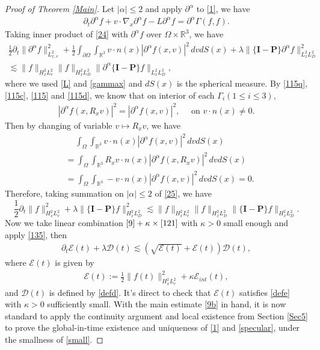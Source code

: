 \documentclass[reqno,a4paper]{amsart}
\numberwithin{equation}{section}
\newcommand{\1}{\mathbf{1}}
\newcommand{\R}{\mathbb{R}}
\renewcommand{\P}{\mathbf{P}}
\newcommand{\E}{\mathcal{E}}
\newcommand{\D}{\mathcal{D}}
\newcommand{\<}{\langle}
\renewcommand{\>}{\rangle}
\newcommand{\I}{\mathbf{I}}
\renewcommand{\P}{\mathbf{P}}
\begin{document}
\begin{proof}[Proof of Theorem \ref{Main}]
	Let $|\alpha|\le 2$ and apply $\partial^\alpha$ to \eqref{1}, we have 
	\begin{align}\label{24}
	\partial_t{\partial^\alpha f}+v\cdot\nabla_x{\partial^\alpha f} - L {\partial^\alpha f} = \partial^\alpha\Gamma(f,f).
	\end{align}
	Taking inner product of \eqref{24} with $\partial^\alpha f$ over $\Omega\times\R^3$, we have 
	\begin{multline}\label{25}
		\frac{1}{2}\partial_t\|\partial^\alpha f\|^2_{L^2_{x,v}} + \frac{1}{2}\int_{\partial\Omega}\int_{\R^3}v\cdot n(x)|\partial^\alpha f(x,v)|^2\,dvdS(x) + \lambda\|\{\I-\P\}\partial^\alpha f\|_{L^2_{x}L^2_D}^2\\ \lesssim \|f\|_{H^2_xL^2_v}\|f\|_{H^2_xL^2_D}\|\partial^\alpha\{\I-\P\} f\|_{L^2_xL^2_D},
	\end{multline}where we used \eqref{L} and \eqref{gammax} and $dS(x)$ is the spherical measure.
By \eqref{115q}, \eqref{115c}, \eqref{115} and \eqref{115d}, we know that on interior of each $\Gamma_i(1\le i\le 3)$, 
\begin{align*}
|\partial^\alpha f(x,R_xv)|^2 = |\partial^\alpha f(x,v)|^2,\quad\text{ on $v\cdot n(x)\neq 0$}. 
\end{align*}
Then by changing of variable $v\mapsto R_xv$, we have 
\begin{align*}
	&\quad\,\int_{\Omega}\int_{\R^3}v\cdot n(x)|\partial^\alpha f(x,v)|^2\,dvdS(x) \\
	&= \int_{\Omega}\int_{\R^3}R_xv\cdot n(x)|\partial^\alpha f(x,R_xv)|^2\,dvdS(x)\\
	&= \int_{\Omega}\int_{\R^3}-v\cdot n(x)|\partial^\alpha f(x,v)|^2\,dvdS(x) = 0. 
\end{align*}
Therefore, taking summation on $|\alpha|\le 2$ of \eqref{25}, we have 
\begin{equation}\label{9}
	\frac{1}{2}\partial_t\|f\|^2_{H^2_xL^2_v} + \lambda\|\{\I-\P\}f\|_{H^2_xL^2_D}^2 \lesssim \|f\|_{H^2_xL^2_v}\|f\|_{H^2_xL^2_D}\|\{\I-\P\} f\|_{H^2_xL^2_D}. 
\end{equation}
Now we take linear combination $\eqref{9}+\kappa\times\eqref{121}$ with $\kappa>0$ small enough and apply \eqref{135}, then 
\begin{align}\label{9b}
	\partial_t\E(t) + \lambda \D(t) \lesssim (\sqrt{\E(t)}+\E(t))\D(t), 
\end{align}
 where $\E(t)$ is given by 
 \begin{align*}
 	\E(t) := \frac{1}{2}\|f(t)\|^2_{H^2_xL^2_v} + \kappa\E_{int}(t),
 \end{align*}
and $\D(t)$ is defined by \eqref{defd}. It's direct to check that $\E(t)$ satisfies \eqref{defe} with $\kappa>0$ sufficiently small. 
With the main estimate \eqref{9b} in hand, it is now standard to apply the continuity argument and local existence from Section \ref{Sec5} to prove the global-in-time existence and uniqueness of \eqref{1} and \eqref{specular}, under the smallness of \eqref{small}. 






\end{proof}
\end{document}
